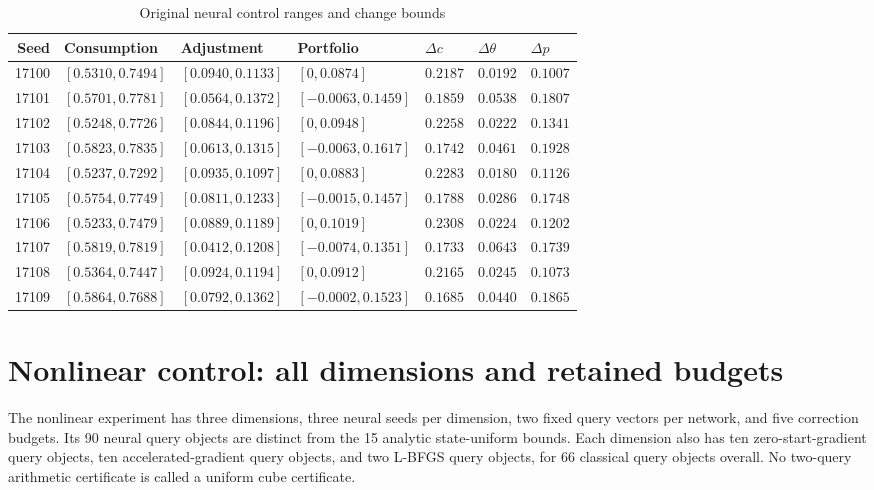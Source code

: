 \begin{table}[t]\centering\footnotesize\caption{Original neural control ranges and change bounds}\begin{tabular}{rllllll}\toprule
Seed & Consumption & Adjustment & Portfolio & $\Delta c$ & $\Delta\theta$ & $\Delta p$\\\midrule
17100 & $[0.5310,0.7494]$ & $[0.0940,0.1133]$ & $[0,0.0874]$ & $0.2187$ & $0.0192$ & $0.1007$ \\
17101 & $[0.5701,0.7781]$ & $[0.0564,0.1372]$ & $[-0.0063,0.1459]$ & $0.1859$ & $0.0538$ & $0.1807$ \\
17102 & $[0.5248,0.7726]$ & $[0.0844,0.1196]$ & $[0,0.0948]$ & $0.2258$ & $0.0222$ & $0.1341$ \\
17103 & $[0.5823,0.7835]$ & $[0.0613,0.1315]$ & $[-0.0063,0.1617]$ & $0.1742$ & $0.0461$ & $0.1928$ \\
17104 & $[0.5237,0.7292]$ & $[0.0935,0.1097]$ & $[0,0.0883]$ & $0.2283$ & $0.0180$ & $0.1126$ \\
17105 & $[0.5754,0.7749]$ & $[0.0811,0.1233]$ & $[-0.0015,0.1457]$ & $0.1788$ & $0.0286$ & $0.1748$ \\
17106 & $[0.5233,0.7479]$ & $[0.0889,0.1189]$ & $[0,0.1019]$ & $0.2308$ & $0.0224$ & $0.1202$ \\
17107 & $[0.5819,0.7819]$ & $[0.0412,0.1208]$ & $[-0.0074,0.1351]$ & $0.1733$ & $0.0643$ & $0.1739$ \\
17108 & $[0.5364,0.7447]$ & $[0.0924,0.1194]$ & $[0,0.0912]$ & $0.2165$ & $0.0245$ & $0.1073$ \\
17109 & $[0.5864,0.7688]$ & $[0.0792,0.1362]$ & $[-0.0002,0.1523]$ & $0.1685$ & $0.0440$ & $0.1865$ \\
\bottomrule\end{tabular}\end{table}

\section{Nonlinear control: all dimensions and retained budgets}\label{supp:r18nonlinear}
The nonlinear experiment has three dimensions, three neural seeds per dimension, two fixed query vectors per network, and five correction budgets. Its 90 neural query objects are distinct from the 15 analytic state-uniform bounds. Each dimension also has ten zero-start-gradient query objects, ten accelerated-gradient query objects, and two L-BFGS query objects, for 66 classical query objects overall. No two-query arithmetic certificate is called a uniform cube certificate.

